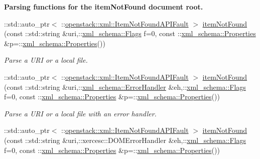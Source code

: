 \begin{Indent}{\bf Parsing functions for the itemNotFound document root.}\par
\begin{DoxyCompactItemize}
\item 
::std::auto\_\-ptr$<$ ::\hyperlink{classopenstack_1_1xml_1_1ItemNotFoundAPIFault}{openstack::xml::ItemNotFoundAPIFault} $>$ \hyperlink{namespaceopenstack_1_1xml_a19390691e2dd8864a3150d5621baef22}{itemNotFound} (const ::std::string \&uri,::\hyperlink{namespacexml__schema_affb4c227cbd9aa7453dd1dc5a1401943}{xml\_\-schema::Flags} f=0, const ::\hyperlink{namespacexml__schema_ad27ce19a7ee1d3b1064092648898f64c}{xml\_\-schema::Properties} \&p=::\hyperlink{namespacexml__schema_ad27ce19a7ee1d3b1064092648898f64c}{xml\_\-schema::Properties}())
\begin{DoxyCompactList}\small\item\em Parse a URI or a local file. \item\end{DoxyCompactList}\item 
::std::auto\_\-ptr$<$ ::\hyperlink{classopenstack_1_1xml_1_1ItemNotFoundAPIFault}{openstack::xml::ItemNotFoundAPIFault} $>$ \hyperlink{namespaceopenstack_1_1xml_a3a22c380ff330b0a1764856d6d7d03f5}{itemNotFound} (const ::std::string \&uri,::\hyperlink{namespacexml__schema_ab1c9361bfd3b404eaabf0c31eded79dc}{xml\_\-schema::ErrorHandler} \&eh,::\hyperlink{namespacexml__schema_affb4c227cbd9aa7453dd1dc5a1401943}{xml\_\-schema::Flags} f=0, const ::\hyperlink{namespacexml__schema_ad27ce19a7ee1d3b1064092648898f64c}{xml\_\-schema::Properties} \&p=::\hyperlink{namespacexml__schema_ad27ce19a7ee1d3b1064092648898f64c}{xml\_\-schema::Properties}())
\begin{DoxyCompactList}\small\item\em Parse a URI or a local file with an error handler. \item\end{DoxyCompactList}\item 
::std::auto\_\-ptr$<$ ::\hyperlink{classopenstack_1_1xml_1_1ItemNotFoundAPIFault}{openstack::xml::ItemNotFoundAPIFault} $>$ \hyperlink{namespaceopenstack_1_1xml_a8e9caa50ceea2ad8eea8b926b9aa5da8}{itemNotFound} (const ::std::string \&uri,::xercesc::DOMErrorHandler \&eh,::\hyperlink{namespacexml__schema_affb4c227cbd9aa7453dd1dc5a1401943}{xml\_\-schema::Flags} f=0, const ::\hyperlink{namespacexml__schema_ad27ce19a7ee1d3b1064092648898f64c}{xml\_\-schema::Properties} \&p=::\hyperlink{namespacexml__schema_ad27ce19a7ee1d3b1064092648898f64c}{xml\_\-schema::Properties}())

\end{DoxyCompactItemize}
\end{Indent}
